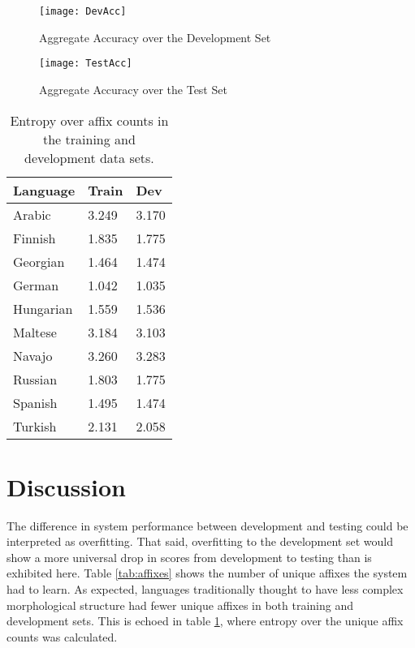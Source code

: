 \documentclass[11pt]{article}
\begin{document}
\begin{figure}
	\centering
      \texttt{[image: DevAcc]}
      \caption{Aggregate Accuracy over the Development Set}
      \label{fig:devchart}
\end{figure}
\begin{figure}
	\centering
      \texttt{[image: TestAcc]}
      \caption{Aggregate Accuracy over the Test Set}
      \label{fig:testchart}
\end{figure}
\begin{table}
	\centering
    \begin{tabular}{l l l}
        Language    &   Train   &   Dev \\\hline
        Arabic    &   3.249    &   3.170    \\
        Finnish    &   1.835    &   1.775    \\
        Georgian    &   1.464    &   1.474    \\
        German    &   1.042    &   1.035    \\
        Hungarian    &   1.559    &   1.536    \\
        Maltese    &   3.184    &   3.103 \\
        Navajo    &   3.260    &   3.283 \\
        Russian    &   1.803    &   1.775    \\
        Spanish    &   1.495    &   1.474    \\
        Turkish    &   2.131 &   2.058    \\
    \end{tabular}
  \caption{Entropy over affix counts in the training and development data sets.}
  \label{tab:entropy}
\end{table}

\section*{Discussion}
The difference in system performance between  development and testing could be interpreted as overfitting.
That said, overfitting to the development set would show a more universal drop in scores from development to testing than is exhibited here.
Table \ref{tab:affixes} shows the number of unique affixes the system had to learn.
As expected, languages traditionally thought to have less complex morphological structure had fewer unique affixes in both training and development sets. 
This is echoed in table \ref{tab:entropy}, where entropy over the unique affix counts was calculated. 
\end{document}
